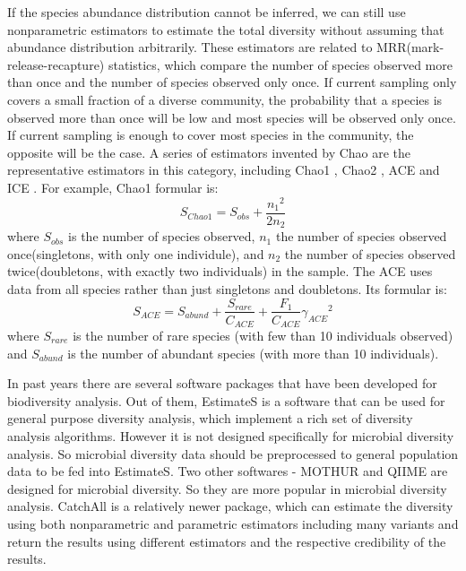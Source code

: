 If the species abundance distribution cannot be inferred, we can still use
nonparametric estimators to estimate the total diversity without assuming that
abundance distribution arbitrarily. These estimators are related to
MRR(mark-release-recapture) statistics, which compare the number of species
observed more than once and the number of species observed only once. If
current sampling only covers a small fraction of a diverse community, the
probability that a species is observed more than once will be low and most
species will be observed only once. If current sampling is enough to cover most
species in the community, the opposite will be the case. A series of estimators
invented by Chao are the representative estimators in this category, including
Chao1 \cite{chao1984nonparametric}, Chao2 \cite{Chao:1987aa}, ACE
\cite{chao1993stopping} and ICE \cite{lee1994estimating}. For example, Chao1
formular is:\\ $${S}_{Chao1}={S}_{obs}+\frac{{{n}_{1}}^{2}}{2{n}_{2}}$$ where
${S}_{obs}$ is the number of species observed, ${n}_{1}$ the number of species
observed once(singletons, with only one individule), and ${n}_{2}$ the number
of species observed twice(doubletons, with exactly two individuals) in the
sample. The ACE uses data from all species rather than just singletons and
doubletons. Its formular is:\\
$${S}_{ACE}={S}_{abund}+\frac{{S}_{rare}}{{C}_{ACE}}+\frac{{F}_{1}}{{C}_{ACE}}{
{\gamma }_{ACE}}^{2}$$ where ${S}_{rare}$ is the number of rare species (with
few than 10 individuals observed) and ${S}_{abund}$ is the number of abundant
species (with more than 10 individuals).

In past years there are several software packages that have been developed for
biodiversity analysis. Out of them, EstimateS \cite{colwellestimates} is a
software that can be used for general purpose diversity analysis, which
implement a rich set of diversity analysis algorithms. However it is not
designed specifically for microbial diversity analysis. So microbial diversity
data should be preprocessed to general population data to be fed into
EstimateS. Two other softwares - MOTHUR \cite{Schloss:2009aa} and QIIME
\cite{Caporaso:2010aa} are designed for microbial diversity. So they are more
popular in microbial diversity analysis. CatchAll \cite{Bunge:2011aa} is a
relatively newer package, which can estimate the diversity using both
nonparametric and parametric estimators including many variants and return the
results using different estimators and the respective credibility of the
results.


